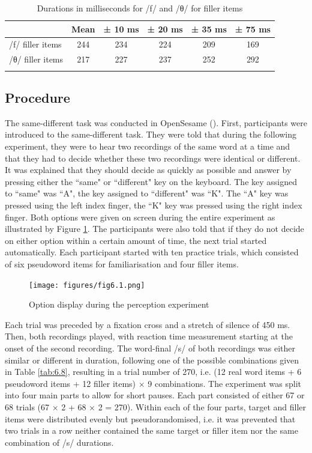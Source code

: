 \begin{table}\fontsize{10}{11}
\caption{Durations in milliseconds for /f/ and /θ/ for filler items}
\label{tab:6.7}
\centering
\begin{tabular}{lccccc} 
\lsptoprule
~             & Mean & ± 10 ms & ± 20 ms & ± 35 ms & ± 75 ms  \\ 
\midrule
/f/ filler items & 244  & 234     & 224     & 209     & 169      \\
/θ/ filler items & 217  & 227     & 237     & 252     & 292      \\
\lspbottomrule
\end{tabular}
\end{table}

\subsection{Procedure}\label{section06_1_3}

The same-different task was conducted in OpenSesame (\cite{Mathot2012}). First, participants were introduced to the same-different task. They were told that during the following experiment, they were to hear two recordings of the same word at a time and that they had to decide whether these two recordings were identical or different. It was explained that they should decide as quickly as possible and answer by pressing either the ``same" or ``different" key on the keyboard. The key assigned to ``same" was ``A", the key assigned to ``different" was ``K". The ``A" key was pressed using the left index finger, the ``K" key was pressed using the right index finger. Both options were given on screen during the entire experiment as illustrated by Figure \ref{fig:6_1}. The participants were also told that if they do not decide on either option within a certain amount of time, the next trial started automatically. Each participant started with ten practice trials, which consisted of six pseudoword items for familiarisation and four filler items.

\begin{figure}
    \centering
    \texttt{[image: figures/fig6.1.png]}
    \caption{Option display during the perception experiment}
    \label{fig:6_1}
\end{figure}

Each trial was preceded by a fixation cross and a stretch of silence of 450 ms. Then, both recordings played, with reaction time measurement starting at the onset of the second recording. The word-final /s/ of both recordings was either similar or different in duration, following one of the possible combinations given in Table \ref{tab:6.8}, resulting in a trial number of 270, i.e. (12 real word items + 6 pseudoword items + 12 filler items) × 9 combinations. The experiment was split into four main parts to allow for short pauses. Each part consisted of either 67 or 68 trials 
(67 × 2 + 68 × 2 = 270). Within each of the four parts, target and filler items were distributed evenly but pseudorandomised, i.e. it was prevented that two trials in a row neither contained the same target or filler item nor the same combination of /s/ durations.

